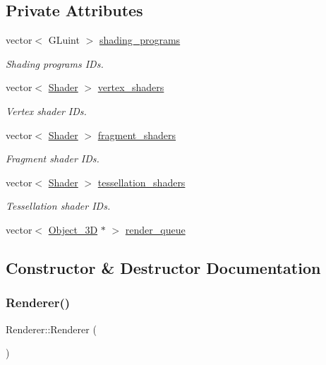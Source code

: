 \subsection*{Private Attributes}
\begin{DoxyCompactItemize}
\item 
vector$<$ G\+Luint $>$ \mbox{\hyperlink{classRenderer_af6f381484978dd5e3b32f1bf18b37c25}{shading\+\_\+programs}}
\begin{DoxyCompactList}\small\item\em Shading programs I\+Ds. \end{DoxyCompactList}\item 
vector$<$ \mbox{\hyperlink{classShader}{Shader}} $>$ \mbox{\hyperlink{classRenderer_a5b8247d261a919a58711df232bf272c5}{vertex\+\_\+shaders}}
\begin{DoxyCompactList}\small\item\em Vertex shader I\+Ds. \end{DoxyCompactList}\item 
vector$<$ \mbox{\hyperlink{classShader}{Shader}} $>$ \mbox{\hyperlink{classRenderer_a7dd27df94abb2368cb00db0f76ff0c66}{fragment\+\_\+shaders}}
\begin{DoxyCompactList}\small\item\em Fragment shader I\+Ds. \end{DoxyCompactList}\item 
vector$<$ \mbox{\hyperlink{classShader}{Shader}} $>$ \mbox{\hyperlink{classRenderer_a6d0795a107f8fd1b3ca9af990e5a0928}{tessellation\+\_\+shaders}}
\begin{DoxyCompactList}\small\item\em Tessellation shader I\+Ds. \end{DoxyCompactList}\item 
vector$<$ \mbox{\hyperlink{classObject__3D}{Object\+\_\+3D}} $\ast$ $>$ \mbox{\hyperlink{classRenderer_a87229d10b904562ac9bc629cb576ca5b}{render\+\_\+queue}}
\end{DoxyCompactItemize}


\subsection{Constructor \& Destructor Documentation}
\mbox{\label{classRenderer_a7ebf46f54dab9905f79b80f7fddb76a6}} 
\subsubsection{\texorpdfstring{Renderer()}{Renderer()}\hspace{0.1cm}{\footnotesize\ttfamily [1/2]}}
{\footnotesize\ttfamily Renderer\+::\+Renderer (\begin{DoxyParamCaption}{ }\end{DoxyParamCaption})}

